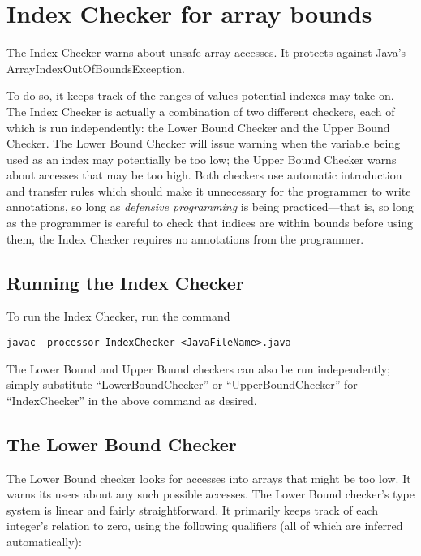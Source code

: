 \chapter{Index Checker for array bounds\label{index-checker}}

The Index Checker warns about unsafe array
accesses.
It protects against Java's
ArrayIndexOutOfBoundsException.

To do so, it keeps track of the ranges of values potential
indexes may take on.  The Index Checker is actually a combination of
two different checkers, each of which is run independently: the Lower
Bound Checker and the Upper Bound Checker.  The Lower Bound Checker
will issue warning when the variable being used as an index may
potentially be too low; the Upper Bound Checker warns about accesses
that may be too high. Both checkers use automatic introduction and
transfer rules which should make it unnecessary for the programmer to
write annotations, so long as \textit{defensive programming} is being
practiced---that is, so long as the programmer is careful to check
that indices are within bounds before using them, the Index Checker
requires no annotations from the programmer.

\section{Running the Index Checker\label{index-running}}

To run the Index Checker, run the command

\begin{Verbatim}
javac -processor IndexChecker <JavaFileName>.java
\end{Verbatim}

The Lower Bound and Upper Bound checkers can also be run
independently; simply substitute ``LowerBoundChecker'' or
``UpperBoundChecker'' for ``IndexChecker'' in the above command as
desired.

\section{The Lower Bound Checker\label{index-lowerbound}}

The Lower Bound checker looks for accesses into arrays that might be
too low.  It warns its users about any such possible accesses. The
Lower Bound checker's type system is linear and fairly
straightforward. It primarily keeps track of each integer's relation
to zero, using the following qualifiers (all of which are inferred
automatically):

